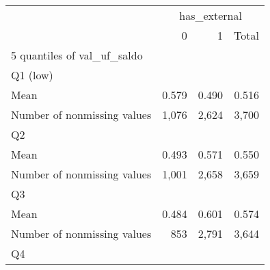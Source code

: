 \documentclass{article}
\begin{document}
\begin{table}[!h]
\centering
\begin{tabular}{llll}
\cline{1-4}
\multicolumn{1}{c}{} &
  \multicolumn{3}{|c}{has\_external} \\
\multicolumn{1}{c}{} &
  \multicolumn{1}{|r}{0} &
  \multicolumn{1}{r}{1} &
  \multicolumn{1}{r}{Total} \\
\cline{1-4}
\multicolumn{1}{l}{5 quantiles of val\_uf\_saldo} &
  \multicolumn{1}{|r}{} &
  \multicolumn{1}{r}{} &
  \multicolumn{1}{r}{} \\
\multicolumn{1}{l}{\hspace{1em}Q1 (low)} &
  \multicolumn{1}{|r}{} &
  \multicolumn{1}{r}{} &
  \multicolumn{1}{r}{} \\
\multicolumn{1}{l}{\hspace{2em}Mean} &
  \multicolumn{1}{|r}{0.579} &
  \multicolumn{1}{r}{0.490} &
  \multicolumn{1}{r}{0.516} \\
\multicolumn{1}{l}{\hspace{2em}Number of nonmissing values} &
  \multicolumn{1}{|r}{1,076} &
  \multicolumn{1}{r}{2,624} &
  \multicolumn{1}{r}{3,700} \\
\multicolumn{1}{l}{\hspace{1em}Q2} &
  \multicolumn{1}{|r}{} &
  \multicolumn{1}{r}{} &
  \multicolumn{1}{r}{} \\
\multicolumn{1}{l}{\hspace{2em}Mean} &
  \multicolumn{1}{|r}{0.493} &
  \multicolumn{1}{r}{0.571} &
  \multicolumn{1}{r}{0.550} \\
\multicolumn{1}{l}{\hspace{2em}Number of nonmissing values} &
  \multicolumn{1}{|r}{1,001} &
  \multicolumn{1}{r}{2,658} &
  \multicolumn{1}{r}{3,659} \\
\multicolumn{1}{l}{\hspace{1em}Q3} &
  \multicolumn{1}{|r}{} &
  \multicolumn{1}{r}{} &
  \multicolumn{1}{r}{} \\
\multicolumn{1}{l}{\hspace{2em}Mean} &
  \multicolumn{1}{|r}{0.484} &
  \multicolumn{1}{r}{0.601} &
  \multicolumn{1}{r}{0.574} \\
\multicolumn{1}{l}{\hspace{2em}Number of nonmissing values} &
  \multicolumn{1}{|r}{853} &
  \multicolumn{1}{r}{2,791} &
  \multicolumn{1}{r}{3,644} \\
\multicolumn{1}{l}{\hspace{1em}Q4} &
  \multicolumn{1}{|r}{} &
  \multicolumn{1}{r}{} &

\end{tabular}
\end{table}
\end{document}
